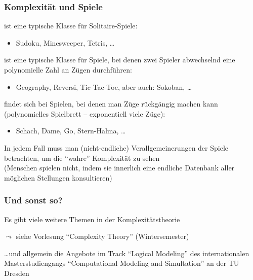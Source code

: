 \documentclass[aspectratio=1610,onlymath]{beamer}
\begin{document}
\begin{frame}\frametitle{Komplexität und Spiele}

\alert{\NP} ist eine typische Klasse für Solitaire-Spiele:
\begin{itemize}
\item Sudoku, Minesweeper, Tetris, \ldots
\end{itemize}
\bigskip\pause

\alert{\PSpace} ist eine typische Klasse für Spiele, bei denen zwei Spieler
abwechselnd eine polynomielle Zahl an Zügen durchführen:
\begin{itemize}
\item Geography, Reversi, Tic-Tac-Toe, aber auch: Sokoban, \ldots
\end{itemize}
\bigskip\pause

\alert{\ExpTime} findet sich bei Spielen, bei denen man Züge rückgängig machen kann (polynomielles Spielbrett -- exponentiell viele Züge):
\begin{itemize}
\item Schach, Dame, Go, Stern-Halma, \ldots
\end{itemize}
\smallskip

In jedem Fall muss man (nicht-endliche) Verallgemeinerungen der Spiele betrachten,
um die "`wahre"' Komplexität zu sehen\\ {\tiny(Menschen spielen nicht, indem sie
innerlich eine endliche Datenbank aller möglichen Stellungen konsultieren)}
\smallskip\pause



\end{frame}

\begin{frame}\frametitle{Und sonst so?}

Es gibt viele weitere Themen in der Komplexitätstheorie
\bigskip

$\leadsto$ siehe Vorlesung "`Complexity Theory"' (Wintersemester)
\bigskip

\ldots und allgemein die Angebote im Track \alert{"`Logical Modeling"'} des
internationalen Masterstudiengangs \alert{"`Computational Modeling and Simultation"'} an der TU Dresden

\end{frame}
\end{document}
